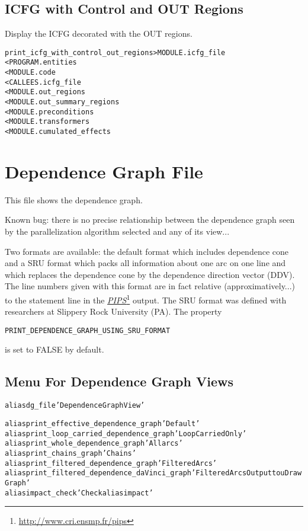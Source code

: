\documentclass[a4paper]{report}
\newenvironment{PipsMake}{\begin{alltt}}{\end{alltt}}
\newcommand{\LINK}[2]{\href{#2}{#1}\footnote{\url{#2}}\xspace}
\newcommand{\PIPS}{\LINK{\emph{PIPS}}{http://www.cri.ensmp.fr/pips}}
\begin{document}
\subsection{ICFG with Control and OUT Regions}

Display the ICFG decorated with the OUT regions.
\begin{PipsMake}
print_icfg_with_control_out_regions     > MODULE.icfg_file
        < PROGRAM.entities
        < MODULE.code
        < CALLEES.icfg_file
        < MODULE.out_regions
        < MODULE.out_summary_regions
        < MODULE.preconditions
        < MODULE.transformers
        < MODULE.cumulated_effects
\end{PipsMake}

\section{Dependence Graph File}
\label{subsection-dependence-graph-file}

This file shows the dependence graph.

Known bug: there is no precise relationship between the dependence graph
seen by the parallelization algorithm selected and any of its view...

Two formats are available: the default format which includes
dependence cone and a SRU format which packs all information about one
arc on one line and which replaces the dependence cone by the
dependence direction vector (DDV). The line numbers given with this
format are in fact relative (approximatively...) to the statement line
in the \PIPS{} output.  The SRU format was defined with researchers at
Slippery Rock University (PA). The property
\begin{center}
\verb/PRINT_DEPENDENCE_GRAPH_USING_SRU_FORMAT/
\end{center}
is set to FALSE by default.

\subsection{Menu For Dependence Graph Views}

\begin{PipsMake}
alias dg_file 'Dependence Graph View'

alias   print_effective_dependence_graph    'Default'
alias   print_loop_carried_dependence_graph 'Loop Carried Only'
alias   print_whole_dependence_graph        'All arcs'
alias   print_chains_graph                  'Chains'
alias   print_filtered_dependence_graph     'Filtered Arcs'
alias   print_filtered_dependence_daVinci_graph   'Filtered Arcs Output to uDrawGraph'
alias   impact_check                        'Check alias impact'
\end{PipsMake}
\end{document}
